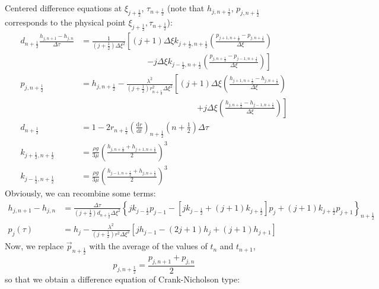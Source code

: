 \documentclass[12pt]{article}
\numberwithin{equation}{section}
\begin{document}
Centered difference equations at $\xi_{j+\frac{1}{2}}$, $\tau_{n+\frac{1}{2}}$ (note that $h_{j,n+\frac{1}{2}}$, $p_{j,n+\frac{1}{2}}$ corresponds to the physical point $\xi_{j+\frac{1}{2}}, \tau_{n+\frac{1}{2}}$):
\begin{align}
	d_{n+\frac{1}{2}}
	\frac{h_{j, n+1} - h_{j,n}}{\Delta \tau}
	&
	=
	\frac{1}{(j +\frac{1}{2})\Delta \xi^2}
	\left[
		(j + 1) \Delta \xi k_{j+\frac{1}{2},n+\frac{1}{2}} \left( \frac{p_{j+1,n+\frac{1}{2}} - p_{j,n+\frac{1}{2}}}{\Delta \xi} \right)
	\right.
	\nonumber \\ &\qquad\qquad\qquad\qquad
	\left.
		-
		j \Delta \xi k_{j-\frac{1}{2},n+\frac{1}{2}} \left( \frac{p_{j,n+\frac{1}{2}} - p_{j-1,n+\frac{1}{2}}}{\Delta \xi} \right)
	\right]
	\\
	p_{j,n+\frac{1}{2}}
	&=
	h_{j,n+\frac{1}{2}}
	-
		\frac{\lambda^2}{(j + \tfrac{1}{2})r^2_{n+\frac{1}{2}} \Delta \xi^2}
	\left[
		(j+1)\Delta \xi \left( \frac{h_{j+1,n+\frac{1}{2}} - h_{j,n+\frac{1}{2}}}{\Delta \xi} \right)
	\right.
	\nonumber \\ &\qquad\qquad\qquad\qquad\qquad\qquad\qquad
	\left.	
		+
		j \Delta \xi \left( \frac{h_{j,n+\frac{1}{2}} - h_{j-1,n+\frac{1}{2}}}{\Delta \xi} \right)
	\right]
	\\
	d_{n+\frac{1}{2}}
	&=
	1 - 2 r_{n+\frac{1}{2}} \left( \frac{\mathrm{d}r}{\mathrm{d}t}\right)_{n+\frac{1}{2}} (n + \tfrac{1}{2}) \Delta \tau
	\\
	k_{j+\frac{1}{2},n+\frac{1}{2}}
	&=
	\frac{\rho g}{3 \mu} \left( \frac{h_{j,n+\frac{1}{2}}+h_{j+1,n+\frac{1}{2}}}{2} \right)^3
	\\
	k_{j-\frac{1}{2},n+\frac{1}{2}}
	&=
	\frac{\rho g}{3 \mu} \left( \frac{h_{j-1,n+\frac{1}{2}}+h_{j,n+\frac{1}{2}}}{2} \right)^3
\end{align}
Obviously, we can recombine some terms:
\begin{align}
	h_{j, n+1} - h_{j,n}
	&
	=
	\frac{ \Delta \tau}{(j +\frac{1}{2})d_{n+\frac{1}{2}}\Delta \xi^2}
	\left\{
		jk_{j-\frac{1}{2}} p_{j-1}
		-
		[
			jk_{j-\frac{1}{2}}
			+
			(j+1)k_{j+\frac{1}{2}}
		]p_{j}
		+
		(j+1)k_{j+\frac{1}{2}} p_{j+1}
	\right\}_{n+\frac{1}{2}}
	\nonumber \\
	p_{j}(\tau)
	&=
	h_{j}
	-
		\frac{\lambda^2}{(j + \tfrac{1}{2})r^2 \Delta \xi^2}
	\left[
		j h_{j-1} - (2j+1) h_j + (j+1) h_{j+1}
	\right]
\end{align}
Now, we replace $\vec{p}_{n+\frac{1}{2}}$ with the average of the values of $t_n$ and $t_{n+1}$,
\[
	p_{j,n+\frac{1}{2}} = \frac{p_{j,n+1} + p_{j,n}}{2}
\]
so that we obtain a difference equation of Crank-Nicholson type:
\end{document}
